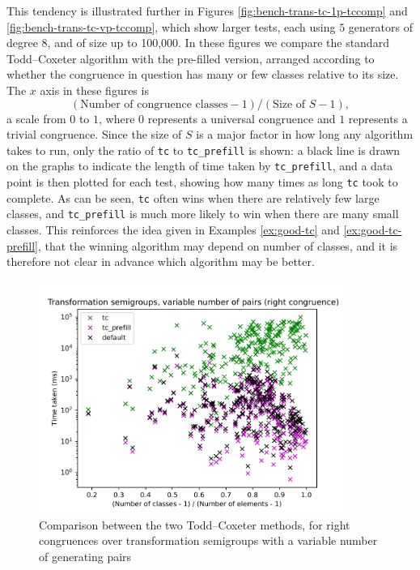 This tendency is illustrated further in Figures
\ref{fig:bench-trans-tc-1p-tccomp} and
\ref{fig:bench-trans-tc-vp-tccomp}, which show larger tests, each using $5$
generators of degree $8$, and of size up to 100,000.  In these figures we
compare the standard Todd--Coxeter algorithm with the pre-filled version, arranged
according to whether the congruence in question has many or few classes relative
to its size.  The $x$ axis in these figures is
$$(\text{Number of congruence classes} - 1) / (\text{Size of~} S - 1),$$
a scale from $0$ to $1$, where $0$ represents a universal congruence and $1$
represents a trivial congruence.  Since the size of $S$ is a major factor in how
long any algorithm takes to run, only the ratio of \texttt{tc} to
\texttt{tc\_prefill} is shown: a black line is drawn on the graphs to indicate
the length of time taken by \texttt{tc\_prefill}, and a data point is then
plotted for each test, showing how many times as long \texttt{tc} took to
complete.  As can be seen, \texttt{tc} often wins when there are relatively few
large classes, and \texttt{tc\_prefill} is much more likely to win when there are
many small classes.  This reinforces the idea given in Examples \ref{ex:good-tc}
and \ref{ex:good-tc-prefill}, that the winning algorithm may depend on number of
classes, and it is therefore not clear in advance which algorithm may be better.

\begin{figure}[p]
  \centering
  \includegraphics[width=0.9\textwidth]{pics/ch-pairs/bench-trans-tc-vp-right-bynrclasses}
  \caption[Benchmark: Todd--Coxeter, concrete, right, $n$ pairs]
  {Comparison between the two Todd--Coxeter methods, for right
    congruences over transformation semigroups with a variable number of
    generating pairs}
  \label{fig:bench-trans-tc-vp-right-bynrclasses}
\end{figure}

